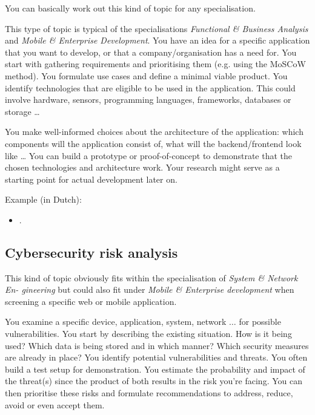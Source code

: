 You can basically work out this kind of topic for any specialisation.

This type of topic is typical of the specialisations \emph{Functional \& Business Analysis} and \emph{Mobile \& Enterprise Development}. You have an idea for a specific application that you want to develop, or that a company/organisation has a need for. You start with gathering requirements and prioritising them (e.g. using the MoSCoW method). You formulate use cases and define a minimal viable product. You identify technologies that are eligible to be used in the application. This could involve hardware, sensors, programming languages, frameworks, databases or storage {\ldots}

You make well-informed choices about the architecture of the application: which components will the application consist of, what will the backend/frontend look like {\ldots} You can build a prototype or proof-of-concept to demonstrate that the chosen technologies and architecture work. Your research might serve as a starting point for actual development later on.

Example (in Dutch):

\begin{itemize}
	\item {} \autocite{VanDerPlaetsen2013}.
\end{itemize}

\subsection{Cybersecurity risk analysis}%
\label{ssec:thesis_type_cybersecurity_risk_analysis}

This kind of topic obviously fits within the specialisation of \emph{System \& Network En-
gineering} but could also fit under \emph{Mobile \& Enterprise development} when screening a specific web or mobile application.

You examine a specific device, application, system, network {$\ldots$} for possible vulnerabilities. You start by describing the existing
situation. How is it being used? Which data is being stored and in which manner? Which security measures are already in place? You identify
potential vulnerabilities and threats. You often build a test setup for
demonstration. You estimate the probability and impact of the threat(s) since the product of both results in the risk you're facing. You can then
prioritise these risks and formulate recommendations to address, reduce, avoid or even accept them.

